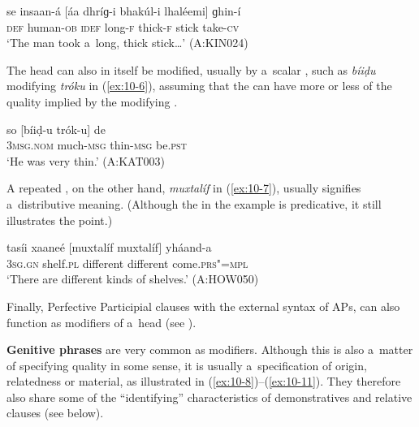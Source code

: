 \begin{exe}
\ex
\label{ex:10-5}
\gll se insaan-á [áa dhríɡ-i bhakúl-i lhaléemi] ɡhin-í \\
\textsc{def} human-\textsc{ob} \textsc{idef} long-\textsc{f} thick-\textsc{f} stick  take-\textsc{cv} \\
\glt `The man took a~long, thick stick{\ldots}' (A:KIN024)
\end{exe}

The  head can also in itself be modified, usually by a~scalar , such as \textit{bíiḍu} modifying \textit{tróku} in (\ref{ex:10-6}), assuming that the  can have more or less of the quality implied by the modifying  . 

\begin{exe}
\ex
\label{ex:10-6}
\gll so [bíiḍ-u trók-u] de \\
\textsc{3msg.nom} much-\textsc{msg} thin-\textsc{msg} be.\textsc{pst} \\
\glt `He was very thin.' (A:KAT003)
\end{exe}

A repeated , on the other hand, \textit{muxtalíf} in (\ref{ex:10-7}), usually signifies a~distributive meaning. (Although the   in the example is predicative, it still illustrates the point.)

\begin{exe}
\ex
\label{ex:10-7}
\gll tasíi xaaneé [muxtalíf muxtalíf] yháand-a \\
\textsc{3sg.gn} shelf.\textsc{pl} different different come.\textsc{prs"=mpl} \\
\glt `There are different kinds of shelves.' (A:HOW050)
\end{exe}

Finally, Perfective Participial clauses with the external syntax of APs, can also function as modifiers of a~head  (see ). 


\textbf{Genitive phrases} are very common as modifiers. Although this is also a~matter of specifying quality in some
sense, it is usually a~specification of origin, relatedness or material, as illustrated in
(\ref{ex:10-8})--(\ref{ex:10-11}). They therefore
also share some of the ``identifying'' characteristics of demonstratives and relative clauses (see
below).

